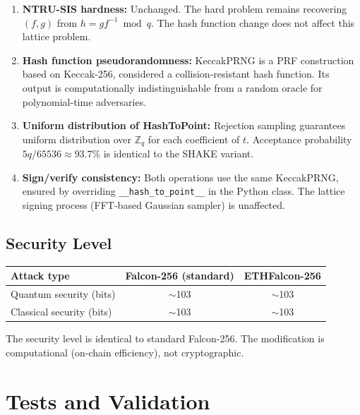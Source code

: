 \documentclass[11pt,a4paper]{article}
\begin{document}
\begin{enumerate}
  \item \textbf{NTRU-SIS hardness:} Unchanged.
        The hard problem remains recovering $(f, g)$ from $h = gf^{-1} \bmod q$.
        The hash function change does not affect this lattice problem.

  \item \textbf{Hash function pseudorandomness:} KeccakPRNG is a PRF
        construction based on Keccak-256, considered a collision-resistant
        hash function. Its output is computationally indistinguishable
        from a random oracle for polynomial-time adversaries.

  \item \textbf{Uniform distribution of HashToPoint:} Rejection sampling
        guarantees uniform distribution over $\mathbb{Z}_q$ for each
        coefficient of $t$. Acceptance probability $5q/65536 \approx 93.7\%$
        is identical to the SHAKE variant.

  \item \textbf{Sign/verify consistency:} Both operations use the same
        KeccakPRNG, ensured by overriding \texttt{\_\_hash\_to\_point\_\_}
        in the Python class. The lattice signing process (FFT-based Gaussian
        sampler) is unaffected.
\end{enumerate}

\subsection{Security Level}

\begin{center}
\begin{tabular}{lcc}
\toprule
Attack type & Falcon-256 (standard) & ETHFalcon-256 \\
\midrule
Quantum security (bits)  & $\sim$103 & $\sim$103 \\
Classical security (bits) & $\sim$103 & $\sim$103 \\
\bottomrule
\end{tabular}
\end{center}

The security level is identical to standard Falcon-256.
The modification is computational (on-chain efficiency), not cryptographic.

\section{Tests and Validation}
\end{document}
